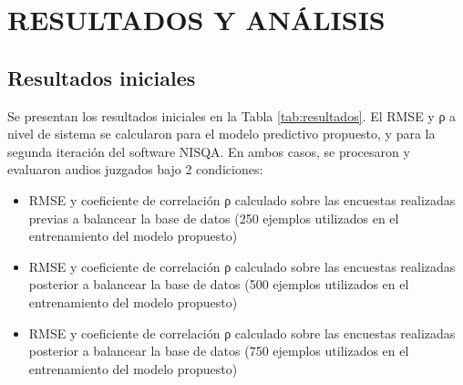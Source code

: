\section{RESULTADOS Y ANÁLISIS}
\subsection{Resultados iniciales}

Se presentan los resultados iniciales en la Tabla \ref{tab:resultados}. El RMSE y ρ a nivel de sistema se calcularon para el modelo predictivo propuesto, y para la segunda iteración del software NISQA. En ambos casos, se procesaron y evaluaron audios juzgados bajo 2 condiciones:
\begin{itemize}
    \item RMSE y coeficiente de correlación ρ calculado sobre las encuestas realizadas previas a balancear la base de datos (250 ejemplos utilizados en el entrenamiento del modelo propuesto)
    \item RMSE y coeficiente de correlación ρ calculado sobre las encuestas realizadas posterior a balancear la base de datos (500 ejemplos utilizados en el entrenamiento del modelo propuesto)
    \item RMSE y coeficiente de correlación ρ calculado sobre las encuestas realizadas posterior a balancear la base de datos (750 ejemplos utilizados en el entrenamiento del modelo propuesto)
    
\end{itemize} 


